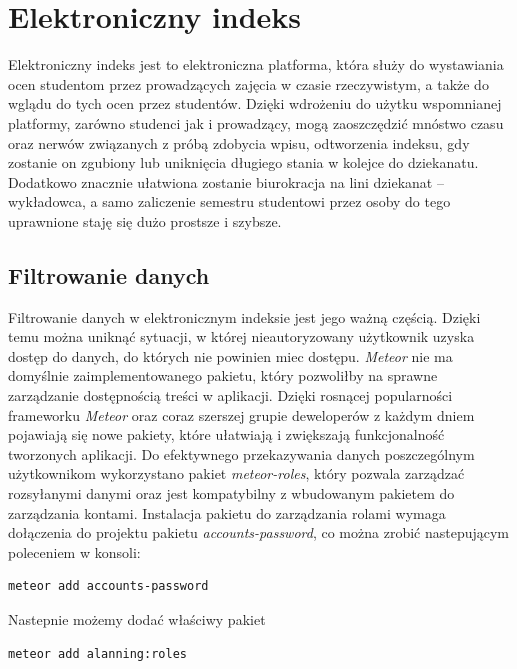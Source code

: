 \documentclass{xmgr}
\begin{document}
\chapter{Elektroniczny indeks}
\indent \indent \indent Elektroniczny indeks jest to elektroniczna platforma, która służy do wystawiania ocen studentom przez prowadzących zajęcia w czasie rzeczywistym, a także do wglądu do tych ocen przez studentów. Dzięki wdrożeniu do użytku wspomnianej platformy, zarówno studenci jak i prowadzący, mogą zaoszczędzić mnóstwo czasu oraz nerwów związanych z próbą zdobycia wpisu, odtworzenia indeksu, gdy zostanie on zgubiony lub uniknięcia długiego stania w kolejce do dziekanatu. Dodatkowo znacznie ułatwiona zostanie biurokracja na lini dziekanat -- wykładowca, a samo zaliczenie semestru studentowi przez osoby do tego uprawnione staję się dużo prostsze i szybsze.

\section{Filtrowanie danych}

\indent \indent \indent Filtrowanie danych w elektronicznym indeksie jest jego ważną częścią. Dzięki temu można uniknąć sytuacji, w której nieautoryzowany użytkownik uzyska dostęp do danych, do których nie powinien miec dostępu. \textit{Meteor} nie ma domyślnie zaimplementowanego pakietu, który pozwoliłby na sprawne zarządzanie dostępnością treści w aplikacji.  Dzięki rosnącej popularności frameworku \textit{Meteor} oraz coraz szerszej grupie deweloperów z każdym dniem pojawiają się nowe pakiety, które ułatwiają i zwiększają funkcjonalność tworzonych aplikacji. Do efektywnego przekazywania danych poszczególnym użytkownikom wykorzystano pakiet \textit{meteor-roles}, który pozwala zarządzać rozsyłanymi danymi oraz jest kompatybilny z wbudowanym pakietem do zarządzania kontami. Instalacja pakietu do zarządzania rolami wymaga dołączenia do projektu pakietu \textit{accounts-password}, co można zrobić nastepującym poleceniem w konsoli:
\newpage
\begin{lstlisting}[language=bash,caption={Instalacja accounts-password}]
	meteor add accounts-password
\end{lstlisting}

Nastepnie możemy dodać właściwy pakiet

\begin{lstlisting}[language=bash,caption={Instalacja pakietu roles}]
	meteor add alanning:roles
\end{lstlisting}
\end{document}

